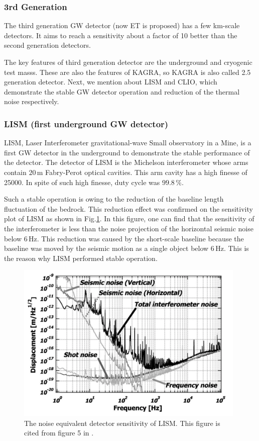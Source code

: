 \subsubsection{3rd Generation}
The third generation GW detector (now ET is proposed) has a few km-scale detectors. It aims to reach a sensitivity about a factor of 10 better than the second generation detectors.

The key features of third generation detector are the underground and cryogenic test masss. These are also the features of KAGRA, so KAGRA is also called 2.5 generation detector. Next, we mention about LISM and CLIO, which demonstrate the stable GW detector operation and reduction of the thermal noise respectively.


\subsubsection{LISM (first underground GW detector)} \label{sec:141_lism}
LISM, Laser Interferometer gravitational-wave Small observatory in a Mine, is a first GW detector in the underground to demonstrate the stable performance of the detector. The detector of LISM is the Michelson interferometer whose arms contain $20\,\mathrm{m}$ Fabry-Perot optical cavities. This arm cavity has a high finesse of 25000. In spite of such high finesse, duty cycle was $99.8\,\%$.

Such a stable operation is owing to the reduction of the baseline length fluctuation of the bedrock. This reduction effect was confirmed on the sensitivity plot of LISM as shown in Fig.\ref{img:img122}. In this figure, one can find that the sensitivity of the interferometer is less than the noise projection of the horizontal seismic noise below $6\,\mathrm{Hz}$. This reduction was caused by the short-scale baseline because the baseline was moved by the seismic motion as a single object below $6\,\mathrm{Hz}$. This is the reason why LISM performed stable operation. 
\begin{figure}[h]
  \begin{center}   
    \includegraphics[width=11cm]{./img_chap1/img122.png}
    \caption{The noise equivalent detector sensitivity of LISM. This figure is cited from figure 5 in \cite{sato2004ultrastable}. } \label{img:img122}
  \end{center}
\end{figure}


